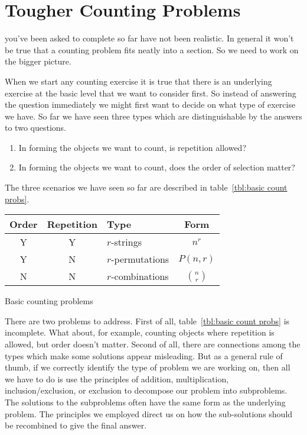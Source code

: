 \chapter{Tougher Counting Problems}\label{ch:Tougher Counting Problems}

 you've been asked to complete so far 
have not been realistic. In general it won't be true that a counting problem
fits neatly into a section. So we need to work on the bigger picture.

When we start any counting exercise it is true that there is an underlying exercise at the
basic level that we want to consider first. So instead of answering the question immediately
we might first want to decide on what type of exercise we have. So far
we have seen three types which are distinguishable by the answers to 
two questions.
\begin{enumerate}
 \item In forming the objects we want to count, is repetition  allowed?
 \item In forming the objects we want to count, does the order of selection matter?
\end{enumerate}

The three scenarios we have seen so far are described in table~\ref{tbl:basic count probs}.
\begin{margintable}
\centering
\begin{tabular}{cclc}
\toprule
Order & Repetition & Type & Form \\
\midrule
Y   &  Y   &  $r$-strings & $n^r$   \\
Y   &  N   &  $r$-permutations & $P(n,r)$   \\
N   &  N   &  $r$-combinations & ${n\choose r}$  \\
\bottomrule %
\end{tabular} %
\caption{Basic counting problems}\label{tbl:basic count probs}
\end{margintable}

There are two problems to address. First of all, table~\ref{tbl:basic count probs}
 is incomplete.
What about, for example, counting objects where repetition is allowed, but order
doesn't matter. Second of all, there are connections among the types which
make some solutions appear misleading. But as a general rule of thumb, if we
correctly identify the type of problem we are working on, then all we have to do
is use the principles of addition, multiplication, inclusion/exclusion, or exclusion
to decompose our problem into subproblems. The solutions to the subproblems 
often have the same form as the underlying problem. The principles we employed
direct us on how the sub-solutions should be recombined to give the final answer.

